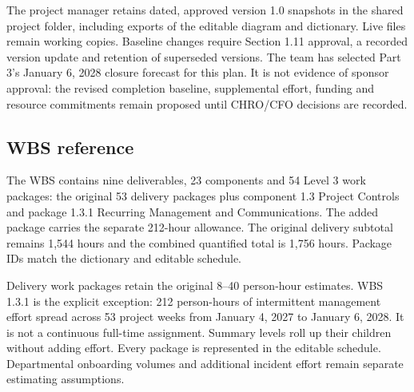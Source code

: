The project manager retains dated, approved version 1.0 snapshots in the shared project folder, including exports of the editable diagram and dictionary. Live files remain working copies. Baseline changes require Section 1.11 approval, a recorded version update and retention of superseded versions. The team has selected Part 3's January 6, 2028 closure forecast for this plan. It is not evidence of sponsor approval: the revised completion baseline, supplemental effort, funding and resource commitments remain proposed until CHRO/\allowbreak{}CFO decisions are recorded.


\subsection{WBS reference}\label{sec:1.9}
The WBS contains nine deliverables, 23 components and 54 Level 3 work packages: the original 53 delivery packages plus component 1.3 Project Controls and package 1.3.1 Recurring Management and Communications. The added package carries the separate 212-hour allowance. The original delivery subtotal remains 1,544 hours and the combined quantified total is 1,756 hours. Package IDs match the dictionary and editable schedule.


Delivery work packages retain the original 8--40 person-hour estimates. WBS 1.3.1 is the explicit exception: 212 person-hours of intermittent management effort spread across 53 project weeks from January 4, 2027 to January 6, 2028. It is not a continuous full-time assignment. Summary levels roll up their children without adding effort. Every package is represented in the editable schedule. Departmental onboarding volumes and additional incident effort remain separate estimating assumptions.


